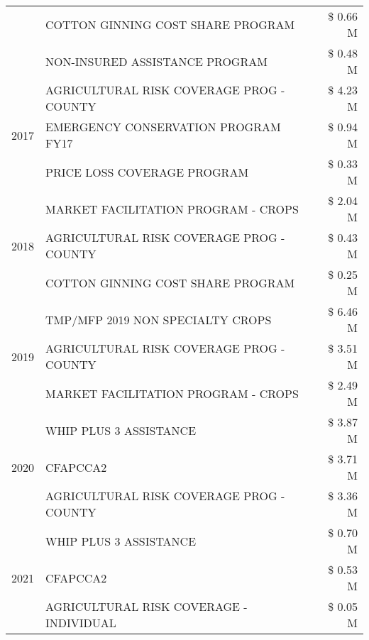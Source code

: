 \begin{tabular}{llr}
 & COTTON GINNING COST SHARE PROGRAM & \$ 0.66 M \\
 & NON-INSURED ASSISTANCE PROGRAM & \$ 0.48 M \\
\cline{1-3}
\multirow[t]{3}{*}{2017} & AGRICULTURAL RISK COVERAGE PROG - COUNTY & \$ 4.23 M \\
 & EMERGENCY CONSERVATION PROGRAM FY17 & \$ 0.94 M \\
 & PRICE LOSS COVERAGE PROGRAM & \$ 0.33 M \\
\cline{1-3}
\multirow[t]{3}{*}{2018} & MARKET FACILITATION PROGRAM - CROPS & \$ 2.04 M \\
 & AGRICULTURAL RISK COVERAGE PROG - COUNTY & \$ 0.43 M \\
 & COTTON GINNING COST SHARE PROGRAM & \$ 0.25 M \\
\cline{1-3}
\multirow[t]{3}{*}{2019} & TMP/MFP 2019 NON SPECIALTY CROPS & \$ 6.46 M \\
 & AGRICULTURAL RISK COVERAGE PROG - COUNTY & \$ 3.51 M \\
 & MARKET FACILITATION PROGRAM - CROPS & \$ 2.49 M \\
\cline{1-3}
\multirow[t]{3}{*}{2020} & WHIP PLUS 3 ASSISTANCE & \$ 3.87 M \\
 & CFAPCCA2 & \$ 3.71 M \\
 & AGRICULTURAL RISK COVERAGE PROG - COUNTY & \$ 3.36 M \\
\cline{1-3}
\multirow[t]{3}{*}{2021} & WHIP PLUS 3 ASSISTANCE & \$ 0.70 M \\
 & CFAPCCA2 & \$ 0.53 M \\
 & AGRICULTURAL RISK COVERAGE - INDIVIDUAL & \$ 0.05 M \\
\cline{1-3}
\bottomrule
\end{tabular}
